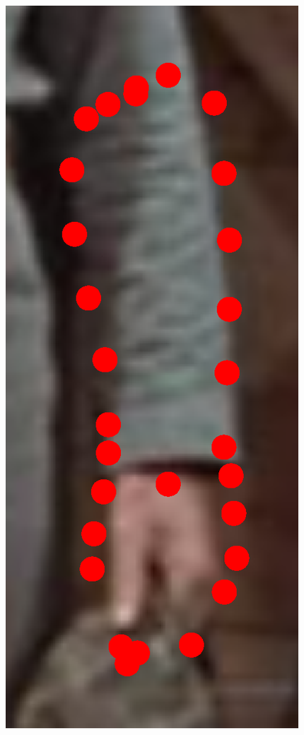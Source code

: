 \begin{figure}[!t]
    \includegraphics[height=\ofh]{resources/Fittings/7.eps}
    \hfill

\end{figure}
